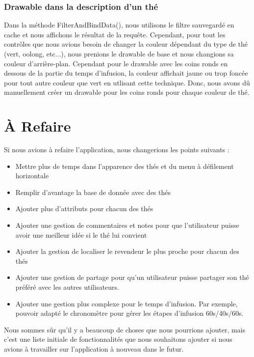 \documentclass[a4paper,12pt]{article}
\begin{document}
\begin{spacing}{1}
	\subsubsection*{Drawable dans la description d'un thé}
	Dans la méthode FilterAndBindData(), nous utilisons le filtre sauvegardé en cache et nous affichons le résultat de la requête. Cependant, pour tout les contrôles que nous avions besoin de changer la couleur dépendant du type de thé (vert, oolong, etc...), nous prenions le drawable de base et nous changions sa couleur d'arrière-plan. Cependant pour le drawable avec les coins ronds en dessous de la partie du temps d'infusion, la couleur affichait jaune ou trop foncée pour tout autre couleur que vert en utlisant cette technique. Donc, nous avons dû manuellement créer un drawable pour les coins ronds pour chaque couleur de thé.
	\section*{À Refaire}
	Si nous avions à refaire l'application, nous changerions les points suivants :
	\begin{itemize}
		\item Mettre plus de temps dans l'apparence des thés et du menu à défilement horizontale
		\item Remplir d'avantage la base de donnée avec des thés
		\item Ajouter plus d'attributs pour chacun des thés
		\item Ajouter une gestion de commentaires et notes pour que l'utilisateur puisse avoir une meilleur idée si le thé lui convient
		\item Ajouter la gestion de localiser le revendeur le plus proche pour chacun des thés
		\item Ajouter une gestion de partage pour qu'un utilisateur puisse partager son thé préféré avec les autres utilisateurs.
		\item Ajouter une gestion plus complexe pour le temps d'infusion. Par exemple, pouvoir adapté le chronomètre pour gérer les étapes d'infusion 60s/40s/60s.
	\end{itemize}
	Nous sommes sûr qu'il y a beaucoup de choses que nous pourrions ajouter, mais c'est une liste initiale de fonctionnalités que nous souhaitons ajouter si nous avions à travailler sur l'application à nouveau dans le futur.
	\end{spacing}                                                 
\end{document}
